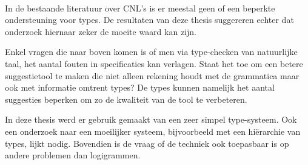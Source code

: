 \paragraph{} In de bestaande literatuur over CNL's is er meestal geen of een beperkte ondersteuning voor types. De resultaten van deze thesis suggereren echter dat onderzoek hiernaar zeker de moeite waard kan zijn.

Enkel vragen die naar boven komen is of men via type-checken van natuurlijke taal, het aantal fouten in specificaties kan verlagen. Staat het toe om een betere suggestietool te maken die niet alleen rekening houdt met de grammatica maar ook met informatie omtrent types? De types kunnen namelijk het aantal suggesties beperken om zo de kwaliteit van de tool te verbeteren.

In deze thesis werd er gebruik gemaakt van een zeer simpel type-systeem. Ook een onderzoek naar een moeilijker systeem, bijvoorbeeld met een hiërarchie van types, lijkt nodig. Bovendien is de vraag of de techniek ook toepasbaar is op andere problemen dan logigrammen.
